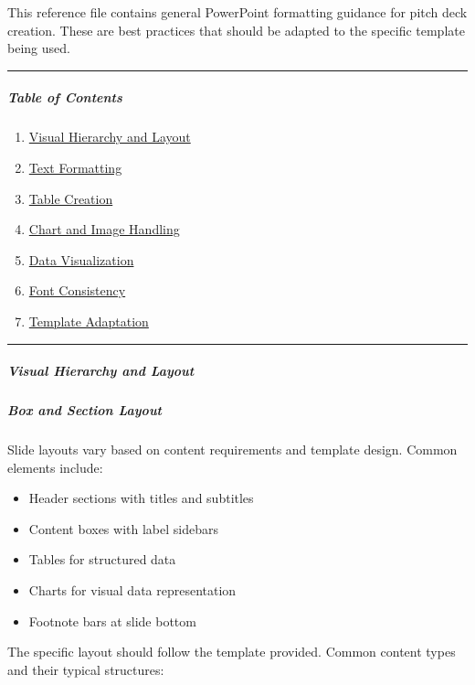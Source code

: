 \documentclass[11pt]{article}
\begin{document}
This reference file contains general PowerPoint formatting guidance for pitch deck creation. These are best practices that should be adapted to the specific template being used.


\vspace{0.5em}\hrule\vspace{0.5em}

\subparagraph{Table of Contents}\mbox{}\par

\begin{enumerate}[leftmargin=*,itemsep=2pt,topsep=2pt]
\item {} \href{\#visual-hierarchy-and-layout}{Visual Hierarchy and Layout}
\item {} \href{\#text-formatting}{Text Formatting}
\item {} \href{\#table-creation}{Table Creation}
\item {} \href{\#chart-and-image-handling}{Chart and Image Handling}
\item {} \href{\#data-visualization}{Data Visualization}
\item {} \href{\#font-consistency}{Font Consistency}
\item {} \href{\#template-adaptation}{Template Adaptation}
\end{enumerate}

\vspace{0.5em}\hrule\vspace{0.5em}

\subparagraph{Visual Hierarchy and Layout}\mbox{}\par

\subparagraph{Box and Section Layout}\mbox{}\par

Slide layouts vary based on content requirements and template design. Common elements include:

\begin{itemize}[leftmargin=*,itemsep=2pt,topsep=2pt]
\item {} Header sections with titles and subtitles
\item {} Content boxes with label sidebars
\item {} Tables for structured data
\item {} Charts for visual data representation
\item {} Footnote bars at slide bottom
\end{itemize}

The specific layout should follow the template provided. Common content types and their typical structures:
\end{document}

